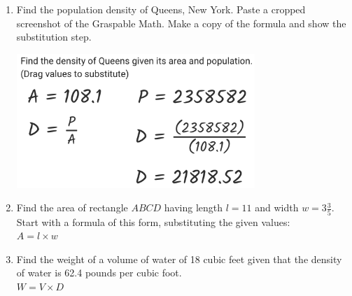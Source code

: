 \begin{enumerate}
\item Find the population density of Queens, New York. Paste a cropped screenshot of the Graspable Math. Make a copy of the formula and show the substitution step.
\vspace{4cm}
\begin{flushright}
  \includegraphics[width=9cm]{../graphics/04solution.png}
\end{flushright}

\item Find the area of rectangle $ABCD$ having length $l=11$ and width $w=3 \frac{3}{5}$. Start with a formula of this form, substituting the given values: \\[0.5cm]
$A = l \times w$
  \begin{flushright}
  \end{flushright}

\item Find the weight of a volume of water of 18 cubic feet given that the density of water is 62.4 pounds per cubic foot.  \\[0.5cm]
$W=V \times D$


\end{enumerate}
